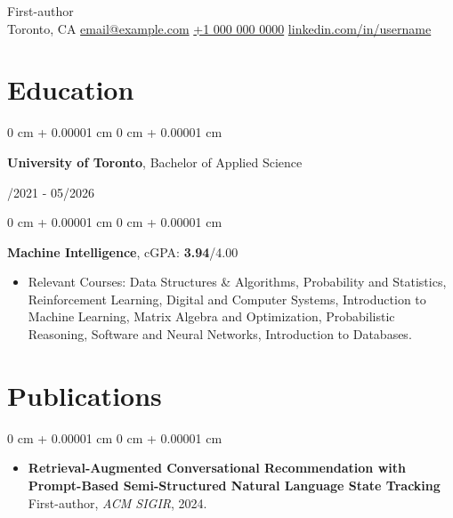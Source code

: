 \documentclass[11pt, letterpaper]{article}
\makeatletter
\newenvironment{highlights}{
    \begin{itemize}[
        topsep=0.08 cm,
        parsep=0.08 cm,
        partopsep=0pt,
        itemsep=0pt,
        leftmargin=0.2 cm + 17pt
    ]
}
{
    \end{itemize}
}
\newenvironment{onecolentry}{
    \begin{adjustwidth}{
        0 cm + 0.00001 cm
    }{
        0 cm + 0.00001 cm
    }
}{
    \end{adjustwidth}
}
\newenvironment{twocolentry}[2][]{
    \onecolentry
    \def\secondColumn{#2}
    \setcolumnwidth{\fill, 4.5 cm}
    \begin{paracol}{2}
}{
    \switchcolumn \raggedleft \secondColumn
    \end{paracol}
    \endonecolentry
}
\newcommand{\contactinfo}{
    \centering
    {\fontsize{25pt}{25pt}\selectfont First-author} \\[4pt]
    \vspace{0.3cm}
    \small Toronto, CA \hfill 
    \href{mailto:email@example.com}{email@example.com} \hfill 
    \href{tel:+1-000-000-0000}{+1 000 000 0000} \hfill 
    \href{https://www.linkedin.com/in/username}{linkedin.com/in/username} \\
}
\makeatother
\begin{document}
\contactinfo
\vspace{2pt}

\section{Education}
\vspace{0.08 cm}
\begin{twocolentry}{09/2021 - 05/2026}
    {\textbf{University of Toronto}}, Bachelor of Applied Science
\end{twocolentry}
\vspace{0.11cm}
\begin{onecolentry}
\hspace{0.3cm}\textbf{Machine Intelligence},  cGPA: {\textbf{3.94}}/4.00
\vspace{0.07cm}
    \begin{highlights}
        \item Relevant Courses: Data Structures \& Algorithms, Probability and Statistics, Reinforcement Learning, Digital and Computer Systems, Introduction to Machine Learning, Matrix Algebra and Optimization, Probabilistic Reasoning, Software and Neural Networks, Introduction to Databases.
    \end{highlights}
\end{onecolentry}

\section{Publications}
\vspace{0.08 cm}
\begin{onecolentry}
    \begin{highlights}
    \item \textbf{Retrieval-Augmented Conversational Recommendation with Prompt-Based Semi-Structured Natural Language State Tracking} \\
    First-author, \textit{ACM SIGIR}, 2024. 
    \end{highlights}
\end{onecolentry}
\end{document}
